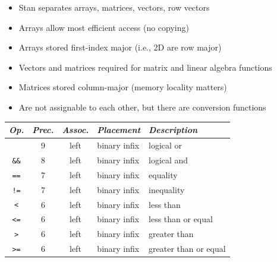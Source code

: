 \documentclass[10pt]{report}
\begin{document}
%
\begin{itemize}
\item Stan separates arrays, matrices, vectors, row vectors 
\item Arrays allow most efficient access (no copying)
\item Arrays stored first-index major (i.e., 2D are row major)
\item Vectors and matrices required for matrix and linear algebra functions
\item Matrices stored column-major (memory locality matters)
\item Are not assignable to each other, but there are conversion functions
\end{itemize}


%
\vfill
\noindent\spc
{\footnotesize
  \begin{tabular}{c|ccl|l}
    {\it Op.} & {\it Prec.} & {\it Assoc.} & {\it
      Placement} & {\it Description}
    \\ \hline \hline
    \code{||} & 9 & left & binary infix & logical or
    \\ \hline
    \Verb|&&| & 8 & left & binary infix & logical and
    \\ \hline
    \Verb|==| & 7 & left & binary infix & equality
    \\
    \Verb|!=| & 7 & left & binary infix & inequality
    \\ \hline
    \Verb|<| & 6 & left & binary infix & less than
    \\
    \Verb|<=| & 6 & left & binary infix & less than or equal
    \\
    \Verb|>| & 6 & left & binary infix & greater than
    \\
    \Verb|>=| & 6 & left & binary infix & greater than or equal
  \end{tabular}
}
\vfill
\vfill
\end{document}
